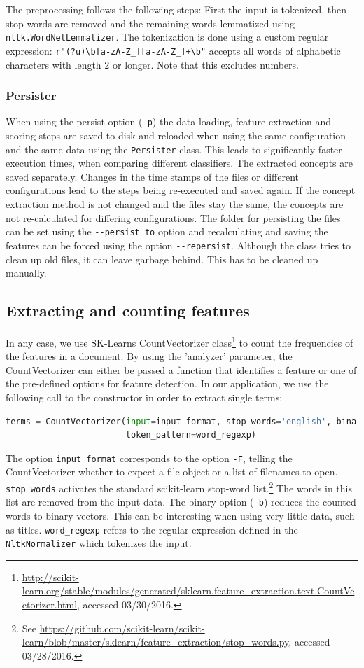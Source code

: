 \documentclass{article}
\begin{document}
The preprocessing follows the following steps:
First the input is tokenized, then stop-words are removed and the remaining words lemmatized using \texttt{nltk.WordNetLemmatizer}.
The tokenization is done using a custom regular expression: \texttt{r"(?u)\textbackslash b[a-zA-Z\_][a-zA-Z\_]+\textbackslash b"}
accepts all words of alphabetic characters with length 2 or longer.
Note that this excludes numbers.

\subsubsection{Persister}
When using the persist option (\texttt{-p}) the data loading, feature extraction and scoring steps are saved to disk
and reloaded when using the same configuration and the same data using the \texttt{Persister} class.
This leads to significantly faster execution times, when comparing different classifiers.
The extracted concepts are saved separately.
Changes in the time stamps of the files or different configurations lead to the steps being re-executed and saved again.
If the concept extraction method is not changed and the files stay the same,
the concepts are not re-calculated for differing configurations.
The folder for persisting the files can be set using the \texttt{{-}{-}persist\_to} option and
recalculating and saving the features can be forced using the option \texttt{{-}{-}repersist}.
Although the class tries to clean up old files, it can leave garbage behind.
This has to be cleaned up manually.

\subsection{Extracting and counting features}
In any case, we use SK-Learns CountVectorizer class\footnote{
  \url{http://scikit-learn.org/stable/modules/generated/sklearn.feature_extraction.text.CountVectorizer.html},
  accessed 03/30/2016. }
to count the frequencies of the features in a document. By using the 'analyzer' parameter, the
CountVectorizer can either be passed a function that identifies a feature or one of the pre-defined options for feature detection. In our application,
we use the following call to the constructor in order to extract single terms:
\begin{lstlisting}[language=Python]
terms = CountVectorizer(input=input_format, stop_words='english', binary=options.binary,
                        token_pattern=word_regexp)
\end{lstlisting}
The option \texttt{input\_format} corresponds to the option \texttt{-F},
telling the CountVectorizer whether to expect a file object or a list of filenames to open.
\texttt{stop\_words} activates the standard scikit-learn stop-word list.\footnote{
  See \url{https://github.com/scikit-learn/scikit-learn/blob/master/sklearn/feature_extraction/stop_words.py}, accessed 03/28/2016.
}
The words in this list are removed from the input data.
The binary option (\texttt{-b}) reduces the counted words to binary vectors.
This can be interesting when using very little data, such as titles.
\texttt{word\_regexp} refers to the regular expression defined in the \texttt{NltkNormalizer} which tokenizes the input.
\end{document}

